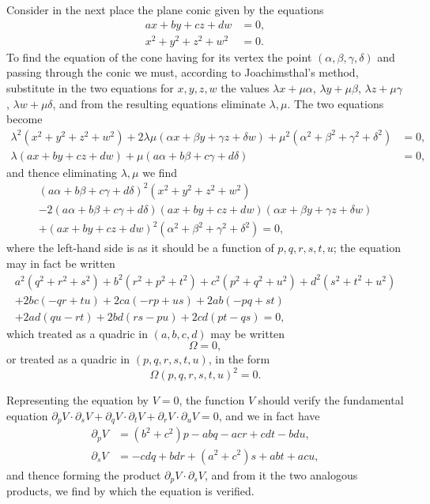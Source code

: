 \documentclass[11pt,a4paper]{book}
\begin{document}
Consider in the next place the plane conic given by the equations
\begin{align*}
ax + by + cz + dw &= 0,\\
x^2 + y^2 + z^2 + w^2 &= 0.
\end{align*}
To find the equation of the cone having for its vertex the point $(\alpha, \beta, \gamma, \delta)$ and passing through the conic we must, according to Joachimsthal's method, substitute in the two equations for $x, y, z, w$ the values $\lambda x + \mu\alpha$, $\lambda y + \mu\beta$, $\lambda z + \mu\gamma$, $\lambda w + \mu\delta$, and from the resulting equations eliminate $\lambda, \mu$. The two equations become
\begin{align*}
\lambda^2(x^2 + y^2 + z^2 + w^2) + 2\lambda\mu(\alpha x + \beta y + \gamma z + \delta w) + \mu^2(\alpha^2 + \beta^2 + \gamma^2 + \delta^2) &= 0,\\
\lambda(ax + by + cz + dw) + \mu(a\alpha + b\beta + c\gamma + d\delta) &= 0,
\end{align*}
and thence eliminating $\lambda, \mu$ we find
\begin{multline*}
(a\alpha + b\beta + c\gamma + d\delta)^2(x^2 + y^2 + z^2 + w^2)\\
- 2(a\alpha + b\beta + c\gamma + d\delta)(ax + by + cz + dw)(\alpha x + \beta y + \gamma z + \delta w)\\
+ (ax + by + cz + dw)^2(\alpha^2 + \beta^2 + \gamma^2 + \delta^2) = 0,
\end{multline*}
where the left-hand side is as it should be a function of $p, q, r, s, t, u$; the equation may in fact be written
\begin{multline*}
a^2(q^2 + r^2 + s^2) + b^2(r^2 + p^2 + t^2) + c^2(p^2 + q^2 + u^2) + d^2(s^2 + t^2 + u^2)\\
+ 2bc(-qr + tu) + 2ca(-rp + us) + 2ab(-pq + st)\\
+ 2ad(qu - rt) + 2bd(rs - pu) + 2cd(pt - qs) = 0,
\end{multline*}
which treated as a quadric in $(a, b, c, d)$ may be written
\[
\Omega = 0,
\]
or treated as a quadric in $(p, q, r, s, t, u)$, in the form
\[
\Omega(p, q, r, s, t, u)^2 = 0.
\]

Representing the equation by $V = 0$, the function $V$ should verify the fundamental equation $\partial_p V \cdot \partial_s V + \partial_q V \cdot \partial_t V + \partial_r V \cdot \partial_u V = 0$, and we in fact have
\begin{align*}
\partial_p V &= (b^2 + c^2)p - abq - acr + cdt - bdu,\\
\partial_s V &= -cdq + bdr + (a^2 + c^2)s + abt + acu,
\end{align*}
and thence forming the product $\partial_p V \cdot \partial_s V$, and from it the two analogous products, we find by which the equation is verified.
\end{document}
